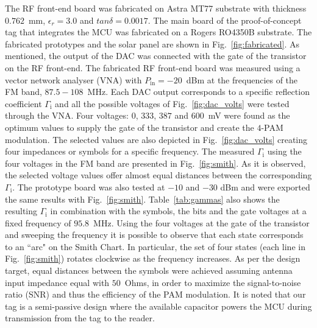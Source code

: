 \documentclass[journal]{IEEEtran}
\begin{document}
The RF front-end board was fabricated on Astra MT77 substrate with thickness $0.762$~mm, $\epsilon_r= 3.0$ and $tan\delta=0.0017$. 
%
%
The main  board of the proof-of-concept tag that integrates the MCU was fabricated on a Rogers RO4350B substrate.
%
The fabricated prototypes and the solar panel  are shown  in  Fig.~\ref{fig:fabricated}.
%
As mentioned, the output of the DAC was connected with the gate of the transistor on the RF front-end.
%
%
The fabricated  RF front-end board was measured using a vector network analyser (VNA) with $P_\text{in}=-20$~dBm at the frequencies of the FM band, $87.5-108$~MHz.
%
Each DAC output corresponds to a specific reflection coefficient $\Gamma_\text{i}$ and all the possible voltages of Fig.~\ref{fig:dac_volts} were tested through the VNA.
%
Four voltages: $0$, $333$, $387$ and $600$~mV were found as the optimum values to supply the gate of the transistor and create the $4$-PAM modulation.
%
The selected values are also depicted in Fig.~\ref{fig:dac_volts} creating  four impedances or symbols for a specific frequency.
%
The measured $\Gamma_\text{i}$  using the four voltages in the FM band are presented in Fig.~\ref{fig:smith}.
%
As it is observed, the selected voltage values offer almost equal distances between the corresponding $\Gamma_\text{i}$.
%
The prototype board was also tested at $-10$ and $-30$ dBm and were exported the same results with Fig.~\ref{fig:smith}. 
%
Table~\ref{tab:gammas} also shows  the resulting $\Gamma_\text{i}$ in combination with the symbols, the bits and the gate voltages at a fixed frequency of $95.8$~MHz.
%
Using the four voltages at the gate of the transistor and sweeping the frequency it is possible to observe that each state corresponds to an ``arc"  on the Smith Chart.
%
In particular, the set of  four states (each line in Fig.~\ref{fig:smith}) rotates clockwise as the frequency increases. 
%
As per the design target, equal distances between the symbols were achieved assuming antenna input impedance equal with $50$~Ohms, in order to maximize the signal-to-noise ratio (SNR)  and thus the efficiency of the PAM modulation.
%
It is noted that our tag is a semi-passive design where the available capacitor  powers the  MCU during transmission from the tag to the reader. 
%
\end{document}
